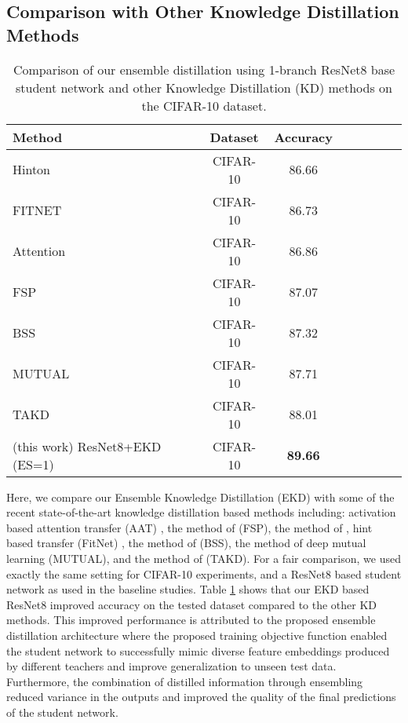 \documentclass{ecai}
\begin{document}
\subsection{Comparison with Other Knowledge Distillation Methods}
\begin{table}\caption{Comparison of our ensemble distillation using 1-branch ResNet8 base student network and other Knowledge Distillation (KD) methods on the CIFAR-10 dataset.}
	\vspace{-0pt}
	\centering
	\setlength\tabcolsep{6.0pt}\centering
	\begin{tabular}{@{}lccccccc@{}}
		\toprule
		\multirow{1}{*}{Method}&\multirow{1}{*}{Dataset} &\multicolumn{1}{c}{Accuracy}\\
		\midrule
		Hinton \cite{hinton2015distilling}& CIFAR-10&86.66\\
		FITNET \cite{mirzadeh2019improved}&CIFAR-10&86.73\\
		Attention \cite{zagoruyko2016paying} &CIFAR-10&86.86\\
		FSP \cite{yim2017gift} &CIFAR-10&87.07\\
		BSS \cite{heo2018improving} &CIFAR-10&87.32\\
		MUTUAL \cite{zhang2018deep} & CIFAR-10&87.71\\
		TAKD \cite{mirzadeh2019improved} &CIFAR-10&88.01\\ 
		(this work) ResNet8+EKD (ES=1)& CIFAR-10&\textbf{89.66}\\					
		\bottomrule
	\end{tabular}
	\vspace{-0pt}
	\label{table_sota}
\end{table}
Here, we compare our Ensemble Knowledge Distillation (EKD) with some of the recent state-of-the-art knowledge distillation based methods including: activation based attention transfer (AAT) \cite{zagoruyko2016paying}, the method of \cite{yim2017gift} (FSP), the method of \cite{hinton2015distilling}, hint based transfer (FitNet) \cite{romero2014fitnets}, the method of \cite{heo2018improving}(BSS), the method of deep mutual learning \cite{zhang2018deep}(MUTUAL), and the method of \cite{mirzadeh2019improved} (TAKD). For a fair comparison, we used exactly the same setting for CIFAR-10 experiments, and a ResNet8 based student network as used in the baseline studies. Table \ref{table_sota} shows that our EKD based ResNet8 improved accuracy on the tested dataset compared to the other KD methods.
This improved performance is attributed to the proposed ensemble distillation architecture where the proposed training objective function enabled the student network to successfully mimic diverse feature embeddings produced by different teachers and improve generalization to unseen test data. Furthermore, the combination of distilled information through ensembling reduced variance in the outputs and improved the quality of the final predictions of the student network.
\end{document}
